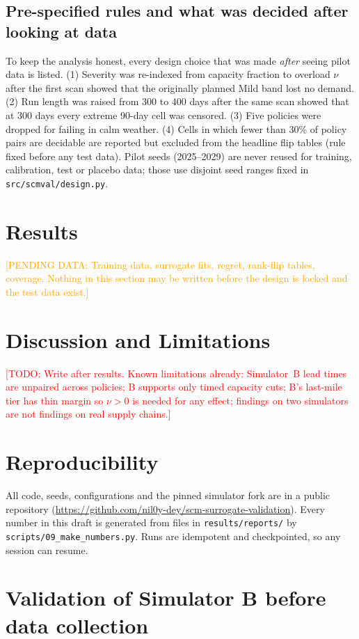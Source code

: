 \documentclass[11pt,a4paper]{article}
\newcommand{\todo}[1]{\textcolor{red}{[TODO: #1]}}
\newcommand{\pending}[1]{\textcolor{orange}{[PENDING DATA: #1]}}
\begin{document}
\subsection{Pre-specified rules and what was decided after looking at data}\label{sec:prereg}
To keep the analysis honest, every design choice that was made \emph{after} seeing pilot data is listed. (1) Severity was re-indexed from capacity fraction to overload $\nu$ after the first scan showed that the originally planned Mild band lost no demand. (2) Run length was raised from 300 to 400 days after the same scan showed that at 300 days every extreme 90-day cell was censored. (3) Five policies were dropped for failing in calm weather. (4) Cells in which fewer than 30\% of policy pairs are decidable are reported but excluded from the headline flip tables (rule fixed before any test data). Pilot seeds (2025--2029) are never reused for training, calibration, test or placebo data; those use disjoint seed ranges fixed in \texttt{src/scmval/design.py}.

\section{Results}
\pending{Training data, surrogate fits, regret, rank-flip tables, coverage. Nothing in this section may be written before the design is locked and the test data exist.}

\section{Discussion and Limitations}
\todo{Write after results. Known limitations already: Simulator~B lead times are unpaired across policies; B supports only timed capacity cuts; B's last-mile tier has thin margin so $\nu>0$ is needed for any effect; findings on two simulators are not findings on real supply chains.}

\section{Reproducibility}
All code, seeds, configurations and the pinned simulator fork are in a public repository (\url{https://github.com/nil0y-dey/scm-surrogate-validation}). Every number in this draft is generated from files in \texttt{results/reports/} by \texttt{scripts/09\_make\_numbers.py}. Runs are idempotent and checkpointed, so any session can resume.

\appendix
\section{Validation of Simulator B before data collection}\label{sec:app-valid}
\end{document}
